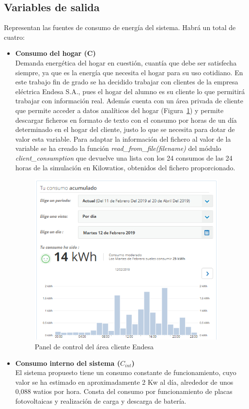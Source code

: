 \subsection{Variables de salida}
Representan las fuentes de consumo de energía del sistema. Habrá un total de cuatro:
\begin{itemize}
\item \textbf{Consumo del hogar (C)}\\Demanda energética del hogar en cuestión, cuantía que debe ser satisfecha siempre, ya que es la energía que necesita el hogar para su uso cotidiano. En este trabajo fin de grado se ha decidido trabajar con clientes de la empresa eléctrica Endesa S.A., pues el hogar del alumno es su cliente lo que permitirá trabajar con información real. Además cuenta con un área privada de cliente que permite acceder a datos analíticos del hogar (Figura~\ref{fig:endesa}) y permite descargar ficheros en formato de texto con el consumo por horas de un día determinado en el hogar del cliente, justo lo que se necesita para dotar de valor esta variable. Para adaptar la información del fichero al valor de la variable se ha creado la función \textit{read\_from\_file(filename)} del módulo \textit{client\_consumption} que devuelve una lista con los 24 consumos de las 24 horas de la simulación en Kilowatios, obtenidos del fichero proporcionado.
  \begin{figure}[!h]
    \centering
    \includegraphics[width=10cm]{figs/Endesa.PNG}
    \caption{Panel de control del área cliente Endesa}
    \label{fig:endesa}
  \end{figure}
\item \textbf{Consumo interno del sistema ($ C_{int} $)}\\El sistema propuesto tiene un consumo constante de funcionamiento, cuyo valor se ha estimado en aproximadamente 2 Kw al día, alrededor de unos 0,088 watios por hora. Consta del consumo por funcionamiento de placas fotovoltaicas y realización de carga y descarga de batería.

\end{itemize}
